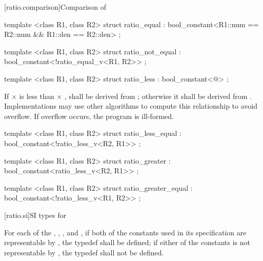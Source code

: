 [ratio.comparison]{Comparison of }

%
\begin{itemdecl}
template <class R1, class R2>
  struct ratio_equal : bool_constant<R1::num == R2::num && R1::den == R2::den> { };
\end{itemdecl}

%
\begin{itemdecl}
template <class R1, class R2>
  struct ratio_not_equal : bool_constant<!ratio_equal_v<R1, R2>> { };
\end{itemdecl}

%
\begin{itemdecl}
template <class R1, class R2>
  struct ratio_less : bool_constant<@\seebelow@> { };
\end{itemdecl}

\begin{itemdescr}
\pnum
If  $\times$  is less than  $\times$ ,
 shall be
derived from ; otherwise it shall be derived from
. Implementations may use other algorithms to
compute this relationship to avoid overflow. If overflow occurs, the program is ill-formed.
\end{itemdescr}

%
\begin{itemdecl}
template <class R1, class R2>
  struct ratio_less_equal : bool_constant<!ratio_less_v<R2, R1>> { };
\end{itemdecl}

%
\begin{itemdecl}
template <class R1, class R2>
  struct ratio_greater : bool_constant<ratio_less_v<R2, R1>> { };
\end{itemdecl}

%
\begin{itemdecl}
template <class R1, class R2>
  struct ratio_greater_equal : bool_constant<!ratio_less_v<R1, R2>> { };
\end{itemdecl}

[ratio.si]{SI types for }

\pnum
For each of the  , ,
, and , if both of the constants used in its
specification are representable by , the typedef shall be
defined; if either of the constants is not representable by ,
the typedef shall not be defined.

